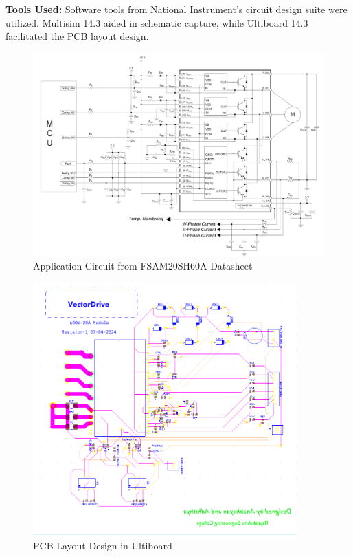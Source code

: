 \textbf{Tools Used:}
Software tools from National Instrument's circuit design suite were utilized. Multisim 14.3 aided in schematic capture, while Ultiboard 14.3 facilitated the PCB layout design.

\begin{figure}[H]
	\centering
	\includegraphics[width=6in]{sections/section4/images/PCBDesign/ApplicationCircuitfromDatasheet.png}
	\caption{Application Circuit from FSAM20SH60A Datasheet}
\end{figure}

\begin{figure}[H]
	\centering
	\includegraphics[width=4in]{sections/section4/images/PCBDesign/Ultiboard/Ultiboard.png}
	\caption{PCB Layout Design in Ultiboard}
\end{figure}

